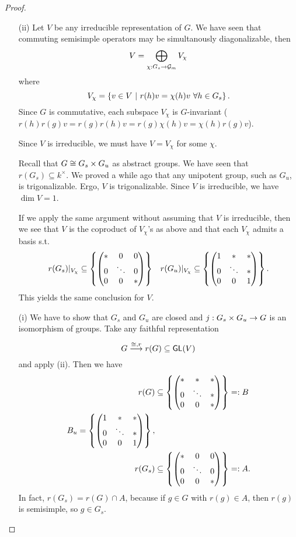 \begin{proof}
\begin{enumerate}
	\item[(ii)] Let $V$ be any irreducible representation of $G$. We have seen that commuting semisimple operators may be simultanously diagonalizable, then
	\[ V = \bigoplus_{\chi : G_s \overset{}{\rightarrow} \mathcal{G}_m} V_\chi \]
	where
	\[ V_\chi = \left\lbrace v \in V ~ | ~ r(h)v = \chi(h)v ~\forall h \in G_s\right\rbrace. \]
	Since $G$ is commutative, each subspace $V_\chi$ is $G$-invariant ($r(h)r(g)v = r(g)r(h)v= r(g)\chi(h)v = \chi(h) r(g)v$).
	
	Since $V$ is irreducible, we must have $V = V_\chi$ for some $\chi$.
	
	Recall that $G \overset{}{\cong} G_s \times G_u$ as abstract groups. We have seen that $r(G_s) \subseteq k^\times$. We proved a while ago that any unipotent group, such as $G_u$, is trigonalizable. Ergo, $V$ is trigonalizable. Since $V$ is irreducible, we have $\dim V = 1$.
	
	If we apply the same argument without assuming that $V$ is irreducible, then we see that $V$ is the coproduct of $V_\chi$'s as above and that each $V_\chi$ admits a basis s.t.
	\begin{align*}
r(G_s)|_{V_\chi} \subseteq \left\lbrace\left(\begin{matrix} * & 0& 0\\
		0 & \ddots & 0\\
		0 & 0 & * \end{matrix}\right)\right\rbrace && 
r(G_u)|_{V_\chi} \subseteq \left\lbrace\left(\begin{matrix} 1 & * & *\\
		0 & \ddots & *\\
		0 & 0 & 1 \end{matrix}\right)\right\rbrace.
\end{align*}
This yields the same conclusion for $V$.
\item[(i)] We have to show that $G_s$ and $G_u$ are closed and $j : G_s \times G_u \overset{}{\rightarrow} G$ is an isomorphism of groups. Take any faithful representation
\[ G \overset{\overset{}{\cong}, r}{\longrightarrow} r(G) \subseteq \textsf{GL}(V) \]
and apply (ii). Then we have
	\begin{align*}
r(G) &\subseteq \left\lbrace\left(\begin{matrix} * & *& *\\
		0 & \ddots & *\\
		0 & 0 & * \end{matrix}\right)\right\rbrace =: B \\
B_u = \left\lbrace\left(\begin{matrix} 1 & * & *\\
		0 & \ddots & *\\
		0 & 0 & 1 \end{matrix}\right)\right\rbrace,\\
	r(G_s) &\subseteq \left\lbrace\left(\begin{matrix} * & 0& 0\\
			0 & \ddots & 0\\
			0 & 0 & * \end{matrix}\right)\right\rbrace =: A. \\
\end{align*}
In fact, $r(G_s) = r(G) \cap A$, because if $g \in G$ with $r(g) \in A$, then $r(g)$ is semisimple, so $g \in G_s$.


\end{enumerate}
\end{proof}
